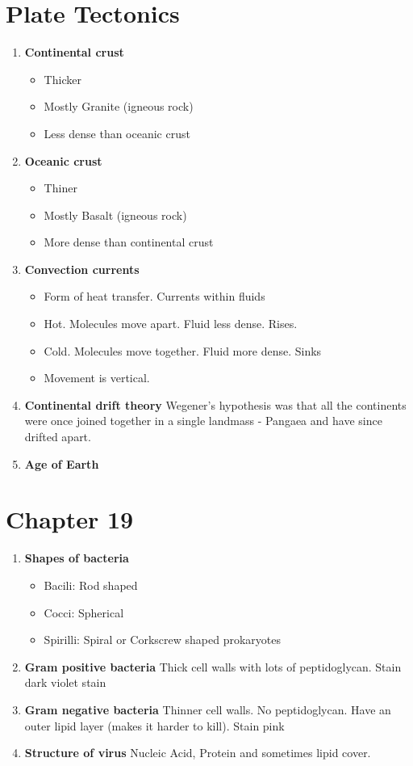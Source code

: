 \documentclass[9pt]{article}
\begin{document}
\section*{Plate Tectonics}
\begin{enumerate}
  \item {\bf Continental crust}
    \begin{itemize}
      \item Thicker
      \item Mostly Granite (igneous rock)
      \item Less dense than oceanic crust
    \end{itemize}
  \item {\bf Oceanic crust}
    \begin{itemize}
      \item Thiner
      \item Mostly Basalt (igneous rock)
      \item More  dense than continental crust
    \end{itemize}
  \item {\bf Convection currents}
    \begin{itemize}
      \item Form of heat transfer. Currents within fluids
      \item Hot. Molecules move apart. Fluid less dense. Rises.
      \item Cold. Molecules move together. Fluid more dense. Sinks
      \item Movement is vertical.
    \end{itemize}
  \item {\bf Continental drift theory} Wegener's hypothesis was that
    all the continents were once joined together in a single landmass
    - Pangaea and have since drifted apart.
  \item {\bf Age of Earth} 
\end{enumerate}
\section*{Chapter 19}
\begin{enumerate}
  \item {\bf Shapes of bacteria}
    \begin{itemize}
    \item Bacili: Rod shaped
    \item Cocci: Spherical
    \item Spirilli: Spiral or Corkscrew shaped prokaryotes
    \end{itemize}
  \item {\bf Gram positive bacteria} Thick cell walls with lots of
    peptidoglycan.  Stain dark violet stain
  \item {\bf Gram negative bacteria} Thinner cell walls. No
    peptidoglycan. Have an outer lipid layer (makes it harder to
    kill). Stain pink
  \item {\bf Structure of virus} Nucleic Acid, Protein and sometimes
    lipid cover.
\end{enumerate}
\end{document}
